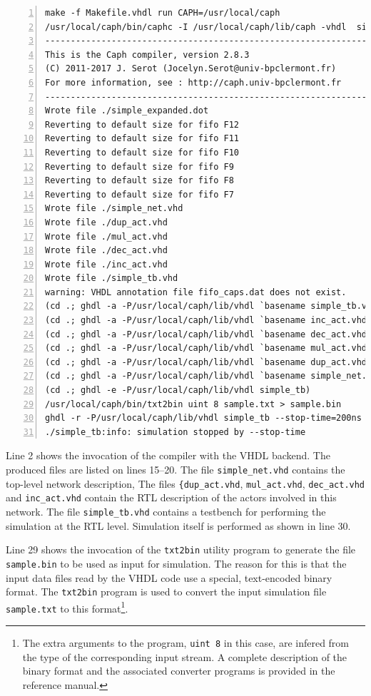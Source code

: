 \begin{lstlisting}[style=BashOutputStyle,numbers=left,numberstyle=\tiny]
make -f Makefile.vhdl run CAPH=/usr/local/caph
/usr/local/caph/bin/caphc -I /usr/local/caph/lib/caph -vhdl  simple.cph
-------------------------------------------------------------------------------------------------
This is the Caph compiler, version 2.8.3
(C) 2011-2017 J. Serot (Jocelyn.Serot@univ-bpclermont.fr)
For more information, see : http://caph.univ-bpclermont.fr
-------------------------------------------------------------------------------------------------
Wrote file ./simple_expanded.dot
Reverting to default size for fifo F12
Reverting to default size for fifo F11
Reverting to default size for fifo F10
Reverting to default size for fifo F9
Reverting to default size for fifo F8
Reverting to default size for fifo F7
Wrote file ./simple_net.vhd
Wrote file ./dup_act.vhd
Wrote file ./mul_act.vhd
Wrote file ./dec_act.vhd
Wrote file ./inc_act.vhd
Wrote file ./simple_tb.vhd
warning: VHDL annotation file fifo_caps.dat does not exist.
(cd .; ghdl -a -P/usr/local/caph/lib/vhdl `basename simple_tb.vhd`)
(cd .; ghdl -a -P/usr/local/caph/lib/vhdl `basename inc_act.vhd`)
(cd .; ghdl -a -P/usr/local/caph/lib/vhdl `basename dec_act.vhd`)
(cd .; ghdl -a -P/usr/local/caph/lib/vhdl `basename mul_act.vhd`)
(cd .; ghdl -a -P/usr/local/caph/lib/vhdl `basename dup_act.vhd`)
(cd .; ghdl -a -P/usr/local/caph/lib/vhdl `basename simple_net.vhd`)
(cd .; ghdl -e -P/usr/local/caph/lib/vhdl simple_tb)
/usr/local/caph/bin/txt2bin uint 8 sample.txt > sample.bin
ghdl -r -P/usr/local/caph/lib/vhdl simple_tb --stop-time=200ns --vcd=simple_tb.vcd 
./simple_tb:info: simulation stopped by --stop-time
\end{lstlisting}

Line 2 shows the invocation of the \caph compiler with the VHDL backend. The produced files are
listed on lines 15--20. The file \texttt{simple\_net.vhd} contains the top-level network
description, The files \verb|{dup_act.vhd|, \verb|mul_act.vhd|, \verb|dec_act.vhd| and
  \verb|inc_act.vhd| contain the RTL description of the actors involved in this network. The file
  \verb|simple_tb.vhd| contains a testbench for performing the simulation at the RTL
  level. Simulation itself is performed as shown in line 30.

  Line 29 shows the invocation of the \verb|txt2bin| utility program to generate the file
  \verb|sample.bin| to be used as input for simulation. The reason for this is that the input data
  files read by the VHDL code use a special, text-encoded binary format. The \verb|txt2bin| program
  is used to convert the input simulation file \verb|sample.txt| to this format\footnote{The extra
    arguments to the program, \texttt{uint 8} in this case, are infered from the type of the
    corresponding input stream. A complete description of the binary format and the associated
    converter programs is provided in the reference manual.}.

